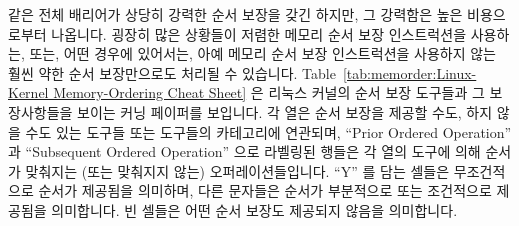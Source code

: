\begin{table}[tbh]
\vspace{5pt}\hfill
{}\OneColumnHSpace{-0.9in}
\caption{Linux-Kernel Memory-Ordering Cheat Sheet}
\label{tab:memorder:Linux-Kernel Memory-Ordering Cheat Sheet}
\end{table}

 같은 전체 배리어가 상당히 강력한 순서 보장을 갖긴 하지만, 그
강력함은 높은 비용으로부터 나옵니다.
굉장히 많은 상황들이 저렴한 메모리 순서 보장 인스트럭션을 사용하는, 또는, 어떤
경우에 있어서는, 아예 메모리 순서 보장 인스트럭션을 사용하지 않는 훨씬 약한
순서 보장만으로도 처리될 수 있습니다.
Table~\ref{tab:memorder:Linux-Kernel Memory-Ordering Cheat Sheet}
은 리눅스 커널의 순서 보장 도구들과 그 보장사항들을 보이는 커닝 페이퍼를
보입니다.
각 열은 순서 보장을 제공할 수도, 하지 않을 수도 있는 도구들 또는 도구들의
카테고리에 연관되며, ``Prior Ordered Operation'' 과 ``Subsequent Ordered
Operation'' 으로 라벨링된 행들은 각 열의 도구에 의해 순서가 맞춰지는 (또는
맞춰지지 않는) 오퍼레이션들입니다.
``Y'' 를 담는 셀들은 무조건적으로 순서가 제공됨을 의미하며, 다른 문자들은
순서가 부분적으로 또는 조건적으로 제공됨을 의미합니다.
빈 셀들은 어떤 순서 보장도 제공되지 않음을 의미합니다.
\iffalse


